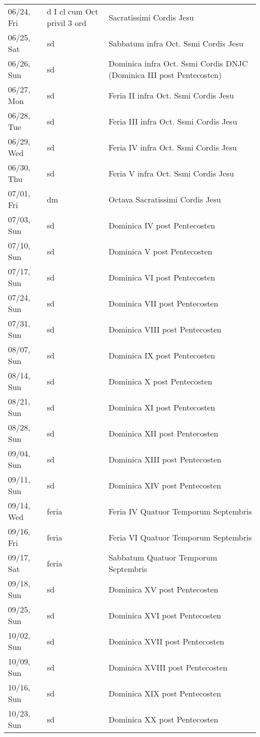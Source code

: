 \documentclass{article}
\begin{document}
\begin{longtable}{ l l l }
06/24, Fri & d I cl cum Oct privil 3 ord & Sacratissimi Cordis Jesu\\
06/25, Sat & sd & Sabbatum infra Oct. Ssmi Cordis Jesu\\
06/26, Sun & sd & Dominica infra Oct. Ssmi Cordis DNJC (Dominica III post Pentecosten)\\
06/27, Mon & sd & Feria II infra Oct. Ssmi Cordis Jesu\\
06/28, Tue & sd & Feria III infra Oct. Ssmi Cordis Jesu\\
06/29, Wed & sd & Feria IV infra Oct. Ssmi Cordis Jesu\\
06/30, Thu & sd & Feria V infra Oct. Ssmi Cordis Jesu\\
07/01, Fri & dm & Octava Sacratissimi Cordis Jesu\\
07/03, Sun & sd & Dominica IV post Pentecosten\\
07/10, Sun & sd & Dominica V post Pentecosten\\
07/17, Sun & sd & Dominica VI post Pentecosten\\
07/24, Sun & sd & Dominica VII post Pentecosten\\
07/31, Sun & sd & Dominica VIII post Pentecosten\\
08/07, Sun & sd & Dominica IX post Pentecosten\\
08/14, Sun & sd & Dominica X post Pentecosten\\
08/21, Sun & sd & Dominica XI post Pentecosten\\
08/28, Sun & sd & Dominica XII post Pentecosten\\
09/04, Sun & sd & Dominica XIII post Pentecosten\\
09/11, Sun & sd & Dominica XIV post Pentecosten\\
09/14, Wed & feria & Feria IV Quatuor Temporum Septembris\\
09/16, Fri & feria & Feria VI Quatuor Temporum Septembris\\
09/17, Sat & feria & Sabbatum Quatuor Temporum Septembris\\
09/18, Sun & sd & Dominica XV post Pentecosten\\
09/25, Sun & sd & Dominica XVI post Pentecosten\\
10/02, Sun & sd & Dominica XVII post Pentecosten\\
10/09, Sun & sd & Dominica XVIII post Pentecosten\\
10/16, Sun & sd & Dominica XIX post Pentecosten\\
10/23, Sun & sd & Dominica XX post Pentecosten\\

\end{longtable}
\end{document}

